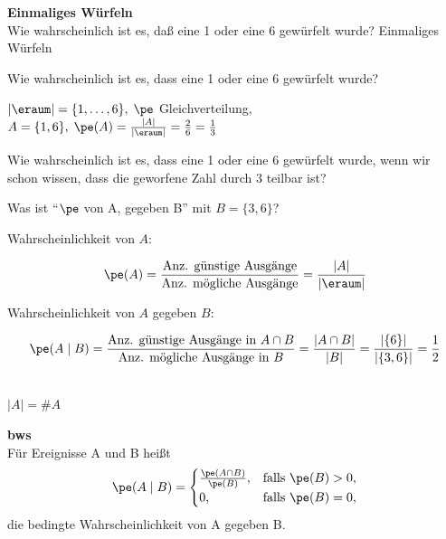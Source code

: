 \begin{bsp}
    \textbf{Einmaliges Würfeln}   \\
    Wie wahrscheinlich ist es, daß eine 1 oder eine 6 gewürfelt wurde?
    Einmaliges Würfeln

    Wie wahrscheinlich ist es, dass eine 1 oder eine 6 gewürfelt wurde?

    $|\eraum| = \{1, \dots, 6\}, \; \pe$ Gleichverteilung, $A = \{1,6\}, \; \pe(A) = \frac{|A|}{|\eraum|} = \frac{2}{6} = \frac{1}{3}$

    Wie wahrscheinlich ist es, dass eine 1 oder eine 6 gewürfelt wurde, wenn wir schon wissen, dass die geworfene Zahl durch 3 teilbar ist?

    Was ist ``$\pe$ von A, gegeben B''  mit $B = \{3,6\}$?

    Wahrscheinlichkeit von $A$:

    \[
        \pe(A) = \frac{\text{Anz. günstige Ausgänge}}{\text{Anz. mögliche Ausgänge}} = \frac{|A|}{|\eraum|}
    \]

    Wahrscheinlichkeit von $A$ gegeben $B$:

    \[
        \pe(A \mid B) =
        \frac{\text{Anz. günstige Ausgänge in } A \cap B}{\text{Anz. mögliche Ausgänge in } B}
        = \frac{|A \cap B|}{|B|}
        = \frac{|\{6\}|}{|\{3,6\}|}
        = \frac{1}{2}
    \]
\end{bsp}
\begin{notation}   \\
    $|A| = \# A$
\end{notation}
\begin{defi}
    \label{def:bedingte-ws} \textbf{\gls{bws}}   \\
    Für Ereignisse A und B heißt
    \[
        \pe(A \mid B) =
        \begin{cases}
            \frac{\pe(A \cap B)}{\pe(B)}, & \text{falls } \pe(B) > 0, \\
            0, & \text{falls } \pe(B) = 0,
        \end{cases}
    \]
    die bedingte Wahrscheinlichkeit von A gegeben B\@.
\end{defi}

